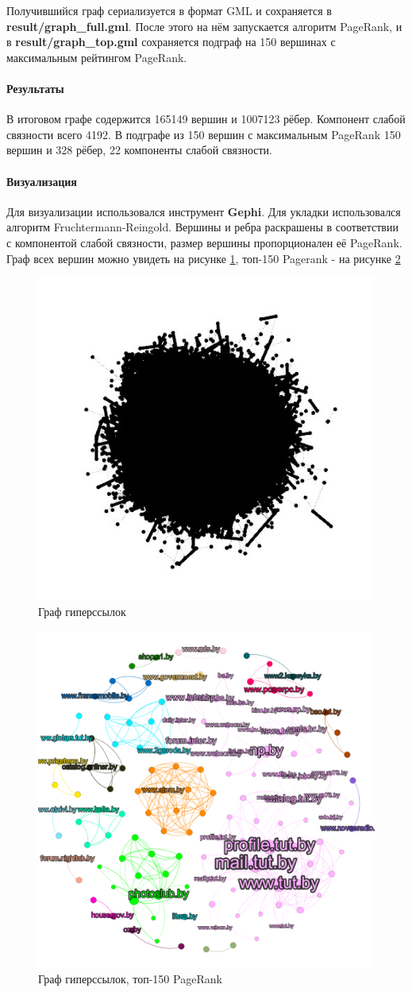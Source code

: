   Получившийся граф сериализуется в формат GML и сохраняется в \textbf{result/graph\_full.gml}. После этого на нём запускается алгоритм PageRank, и  в \textbf{result/graph\_top.gml} сохраняется подграф на 150 вершинах с максимальным рейтингом PageRank.
 \paragraph{Результаты}
 В итоговом графе содержится 165149 вершин и 1007123 рёбер. Компонент слабой связности всего 4192. В подграфе из 150 вершин с максимальным PageRank 150 вершин и 328 рёбер, 22 компоненты слабой связности. 
 \paragraph{Визуализация}
 Для визуализации использовался инструмент \textbf{Gephi}. Для укладки использовался алгоритм Fruchtermann-Reingold. Вершины и ребра раскрашены в соответствии с компонентой слабой связности, размер вершины пропорционален её PageRank. Граф всех вершин можно увидеть на рисунке \ref{graph-all}, топ-150 Pagerank - на рисунке \ref{graph-top} 
 
 \begin{figure}[h]
 	\includegraphics[width=.5\textwidth]{graph_all.jpeg}
 	\caption{Граф гиперссылок}
 	\label{graph-all}
 \end{figure}
 
 \begin{figure}[h]
 	\includegraphics[width=.5\textwidth]{graph_top_white.png}
 	\caption{Граф гиперссылок, топ-150 PageRank}
 	\label{graph-top}
 \end{figure}
 